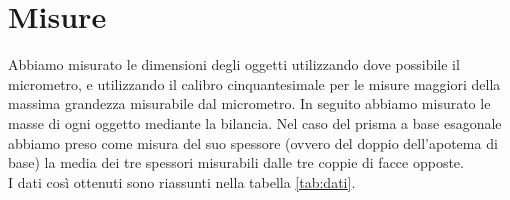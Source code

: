 \documentclass{article}
\begin{document}
    \section{Misure}
    Abbiamo misurato le dimensioni degli oggetti utilizzando dove possibile il micrometro,
    e utilizzando il calibro cinquantesimale per le misure maggiori della massima grandezza
    misurabile dal micrometro. In seguito abbiamo misurato le masse di ogni oggetto mediante
    la bilancia. Nel caso del prisma a base esagonale abbiamo preso come misura del suo
    spessore (ovvero del doppio dell'apotema di base) la media dei tre spessori misurabili
    dalle tre coppie di facce opposte.\\
    I dati così ottenuti sono riassunti nella tabella \ref{tab:dati}.
    \begin{table}[h]
        \centering
        \\
        \\
\end{table}
\end{document}
